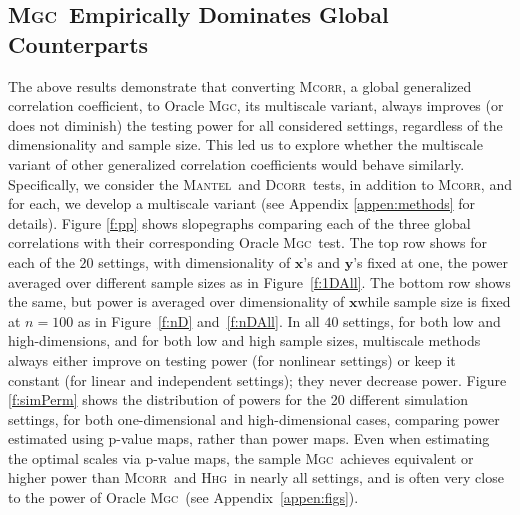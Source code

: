 \documentclass[11pt]{article}
\providecommand{\sct}[1]{{\normalfont\textsc{#1}}}
\providecommand{\mb}[1]{\boldsymbol{#1}}
\newcommand{\Mgc}{\sct{Mgc}}
\newcommand{\Hhg}{\sct{Hhg}}
\newcommand{\Dcorr}{\sct{Dcorr}}
\newcommand{\Mcorr}{\sct{Mcorr}}
\newcommand{\Mantel}{\sct{Mantel}}
\newcommand{\mbx}{\ensuremath{\mb{x}}}
\newcommand{\mby}{\ensuremath{\mb{y}}}
\begin{document}
\subsection*{\Mgc~Empirically Dominates Global Counterparts}

The above results demonstrate that converting \Mcorr, a global generalized correlation coefficient, to Oracle \Mgc, its multiscale variant, always improves (or does not diminish) the testing power for all considered settings, regardless of the dimensionality and sample size.  This led us to explore whether the multiscale variant of other generalized correlation coefficients would behave similarly.  Specifically, we consider the \Mantel~and \Dcorr~tests, in addition to \Mcorr, and for each, we develop a multiscale variant (see Appendix \ref{appen:methods} for details). 
Figure \ref{f:pp} shows slopegraphs comparing each of the three global correlations with their corresponding Oracle \Mgc~test.  The top row shows for each of the $20$ settings, with dimensionality of \mbx's and \mby's  fixed at one, the  power averaged over different sample sizes as in Figure~\ref{f:1DAll}.  The bottom row shows the same, but power is averaged over dimensionality of \mbx while sample size is fixed at $n=100$ as in Figure~\ref{f:nD} and~\ref{f:nDAll}.  In all $40$ settings, for both low and high-dimensions, and for both low and high sample sizes, multiscale methods always either improve on testing power (for nonlinear settings) or keep it constant (for linear and independent settings); they never decrease power. 
%
%
%
Figure \ref{f:simPerm} shows the distribution of powers for the 20 different simulation settings, for both one-dimensional and high-dimensional cases, comparing power estimated using p-value maps, rather than power maps.  
Even when estimating the optimal scales via p-value maps, the sample \Mgc~achieves equivalent or higher power than \Mcorr~and \Hhg~in nearly all settings, and is often very close to the power of Oracle \Mgc~(see Appendix~\ref{appen:figs}).
\end{document}
